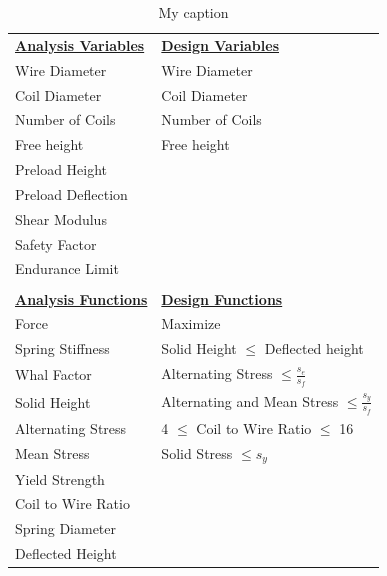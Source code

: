 \documentclass{article}
\begin{document}
\begin{table}[H]
\centering
\caption{My caption}
\label{my-label}
\begin{tabular}{l@{\hskip 2in}l}
\underline{\textbf{Analysis Variables}} & \underline{\textbf{Design Variables}}                             \\
Wire Diameter               & Wire Diameter                                           \\
Coil Diameter               & Coil Diameter                                           \\
Number of Coils             & Number of Coils                                         \\
Free height                 & Free height                                             \\
Preload Height              &                                                         \\
Preload Deflection          &                                                         \\
Shear Modulus               &                                                         \\
Safety Factor               &                                                         \\
Endurance Limit             &                                                         \\
                            &                                                         \\
\underline{\textbf{Analysis Functions}} & \underline{\textbf{Design Functions}}       \\
Force                       & Maximize                                                \\
Spring Stiffness            & Solid Height $\leq$ Deflected height                    \\
Whal Factor                 & Alternating Stress $\leq \frac{s_{e}}{s_{f}}$           \\
Solid Height                & Alternating and Mean Stress $\leq \frac{s_{y}}{s_{f}}$  \\
Alternating Stress          & 4 $\leq$ Coil to Wire Ratio $\leq$ 16                   \\
Mean Stress                 & Solid Stress $\leq s_{y}$                               \\
Yield Strength              &                                                         \\
Coil to Wire Ratio          &                                                         \\
Spring Diameter             &                                                         \\
Deflected Height            &                                                        
\end{tabular}
\end{table}
\end{document}
